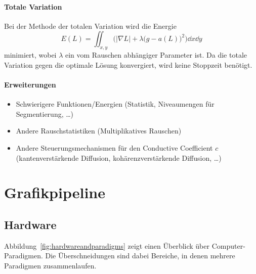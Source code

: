 			\subsubsection{Totale Variation}
				Bei der Methode der totalen Variation wird die Energie
				\begin{equation*}
					E(L) = \iint_{x, y} \! \Big( \lvert \nabla L \rvert + \lambda\big( g - a(L) \big)^2 \Big) \dd{x} \dd{y}
				\end{equation*}
				minimiert, wobei \(\lambda\) ein vom Rauschen abhängiger Parameter ist. Da die totale Variation gegen die optimale Lösung konvergiert, wird keine Stoppzeit benötigt.

			\subsubsection{Erweiterungen}
				\begin{itemize}
					\item Schwierigere Funktionen/Energien (Statistik, Niveaumengen für Segmentierung, \dots)
					\item Andere Rauschstatistiken (\zB Multiplikatives Rauschen)
					\item Andere Steuerungsmechanismen für den Conductive Coefficient \(c\) (\zB kantenverstärkende Diffusion, kohärenzverstärkende Diffusion, \dots)
				\end{itemize}

\chapter{Grafikpipeline}
	\section{Hardware}
		Abbildung~\ref{fig:hardwareandparadigms} zeigt einen Überblick über Computer-Paradigmen. Die Überschneidungen sind dabei Bereiche, in denen mehrere Paradigmen zusammenlaufen.


